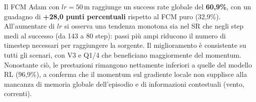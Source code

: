 \documentclass[12pt, a4paper]{article}
\begin{document}
\begin{table}[H]
\centering
\renewcommand{\arraystretch}{1.3}
\caption{Sweep su $lr$ per FCM Adam ($\beta_1{=}0{,}9$, $\beta_2{=}0{,}999$, $\Delta x_{\max}{=}50\,\text{m}$,
         $r_s{=}50\,\text{m}$, 624 episodi per valore). In verde il valore ottimale $lr{=}50\,\text{m}$.}
\end{table}

Il FCM Adam con $lr = 50\,\text{m}$ raggiunge un success rate globale del \textbf{60{,}9\%},
con un guadagno di \textbf{+28{,}0 punti percentuali} rispetto al FCM puro (32{,}9\%).
All'aumentare di $lr$ si osserva una tendenza monotona sia nel SR che negli step medi al
successo (da 143 a 80 step): passi pi\`u ampi riducono il numero di timestep necessari
per raggiungere la sorgente.
Il miglioramento \`e consistente su tutti gli scenari, con V3 e Q1/4 che beneficiano maggiormente
del momentum.
Nonostante ci\`o, le prestazioni rimangono nettamente inferiori a quelle del modello
RL (96{,}9\%), a conferma che il momentum sul gradiente locale non supplisce alla mancanza
di memoria globale dell'episodio e di informazioni contestuali (vento, correnti).
\end{document}
